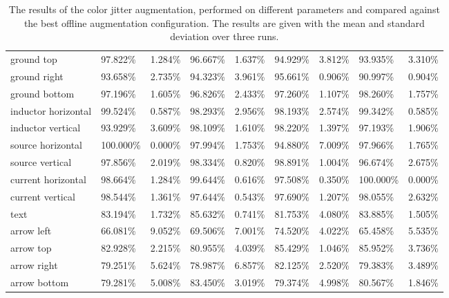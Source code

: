 \begin{table}[H]
\begin{center}
\begin{tabular}{|l|l|l|l|l|l|l|l|l|}
ground top                      & 97.822\%  & 1.284\% & 96.667\%  & 1.637\% & 94.929\% & 3.812\%  & 93.935\%  & 3.310\%   \\
\rowcolor{lightgray!50}
ground right                    & 93.658\%  & 2.735\% & 94.323\%  & 3.961\% & 95.661\% & 0.906\%  & 90.997\%  & 0.904\%   \\
ground bottom                   & 97.196\%  & 1.605\% & 96.826\%  & 2.433\% & 97.260\% & 1.107\%  & 98.260\%  & 1.757\%   \\
\rowcolor{lightgray!50}
inductor horizontal             & 99.524\%  & 0.587\% & 98.293\%  & 2.956\% & 98.193\% & 2.574\%  & 99.342\%  & 0.585\%   \\
inductor vertical               & 93.929\%  & 3.609\% & 98.109\%  & 1.610\% & 98.220\% & 1.397\%  & 97.193\%  & 1.906\%   \\
\rowcolor{lightgray!50}
source horizontal               & 100.000\% & 0.000\% & 97.994\%  & 1.753\% & 94.880\% & 7.009\%  & 97.966\%  & 1.765\%   \\
source vertical                 & 97.856\%  & 2.019\% & 98.334\%  & 0.820\% & 98.891\% & 1.004\%  & 96.674\%  & 2.675\%   \\
\rowcolor{lightgray!50}
current horizontal              & 98.664\%  & 1.284\% & 99.644\%  & 0.616\% & 97.508\% & 0.350\%  & 100.000\% & 0.000\%   \\
current vertical                & 98.544\%  & 1.361\% & 97.644\%  & 0.543\% & 97.690\% & 1.207\%  & 98.055\%  & 2.632\%   \\
\rowcolor{lightgray!50}
text                            & 83.194\%  & 1.732\% & 85.632\%  & 0.741\% & 81.753\% & 4.080\%  & 83.885\%  & 1.505\%   \\
arrow left                      & 66.081\%  & 9.052\% & 69.506\%  & 7.001\% & 74.520\% & 4.022\%  & 65.458\%  & 5.535\%   \\
\rowcolor{lightgray!50}
arrow top                       & 82.928\%  & 2.215\% & 80.955\%  & 4.039\% & 85.429\% & 1.046\%  & 85.952\%  & 3.736\%   \\
arrow right                     & 79.251\%  & 5.624\% & 78.987\%  & 6.857\% & 82.125\% & 2.520\%  & 79.383\%  & 3.489\%   \\
\rowcolor{lightgray!50}
arrow bottom                    & 79.281\%  & 5.008\% & 83.450\%  & 3.019\% & 79.374\% & 4.998\%  & 80.567\%  & 1.846\%   \\
\hline

\end{tabular}
\caption{The results of the color jitter augmentation, performed on different parameters and compared against the best offline augmentation configuration. The results are given with the mean and standard deviation over three runs.}
\label{tab:yolo_color_jitter_augmentation_result}
\end{center}
\end{table}


